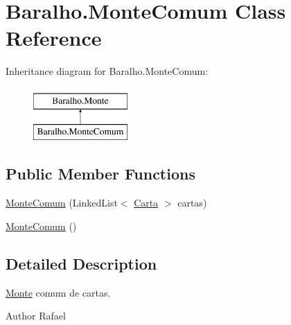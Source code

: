 \hypertarget{class_baralho_1_1_monte_comum}{
\section{Baralho.MonteComum Class Reference}
\label{class_baralho_1_1_monte_comum}
}
Inheritance diagram for Baralho.MonteComum:\begin{figure}[H]
\begin{center}
\leavevmode
\includegraphics[height=2.000000cm]{class_baralho_1_1_monte_comum}
\end{center}
\end{figure}
\subsection*{Public Member Functions}
\begin{DoxyCompactItemize}
\item 
\hyperlink{class_baralho_1_1_monte_comum_af3664ab9b41ef3ea435033c9ae0132b9}{MonteComum} (LinkedList$<$ \hyperlink{class_baralho_1_1_carta}{Carta} $>$ cartas)
\item 
\hyperlink{class_baralho_1_1_monte_comum_ae5f9907b5ae8ec73544895110c7a0395}{MonteComum} ()
\end{DoxyCompactItemize}


\subsection{Detailed Description}
\hyperlink{class_baralho_1_1_monte}{Monte} comum de cartas. \begin{DoxyAuthor}{Author}
Rafael 
\end{DoxyAuthor}


